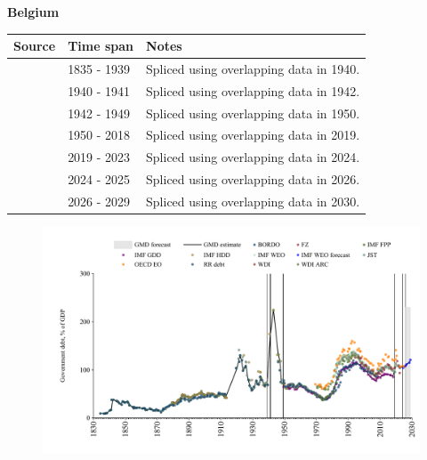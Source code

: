 \documentclass[12pt,a4paper,landscape]{article}
\begin{document}
\begin{adjustbox}{max totalsize={\paperwidth}{\paperheight},center}
\begin{minipage}[t][\textheight][t]{\textwidth}
\vspace*{0.5cm}
{}
\begin{center}
{\Large\bfseries Belgium}
\end{center}
\vspace{0.5cm}
\begin{table}[H]
\centering
\small
\begin{tabular}{|l|l|l|}
\hline
\textbf{Source} & \textbf{Time span} & \textbf{Notes} \\
\hline
\rowcolor{white}\cite{IMF_FPP}& 1835 - 1939 &Spliced using overlapping data in 1940.\\
\rowcolor{lightgray}\cite{IMF_HDD}& 1940 - 1941 &Spliced using overlapping data in 1942.\\
\rowcolor{white}\cite{IMF_FPP}& 1942 - 1949 &Spliced using overlapping data in 1950.\\
\rowcolor{lightgray}\cite{IMF_GDD}& 1950 - 2018 &Spliced using overlapping data in 2019.\\
\rowcolor{white}\cite{IMF_FPP}& 2019 - 2023 &Spliced using overlapping data in 2024.\\
\rowcolor{lightgray}\cite{OECD_EO}& 2024 - 2025 &Spliced using overlapping data in 2026.\\
\rowcolor{white}\cite{IMF_WEO_forecast}& 2026 - 2029 &Spliced using overlapping data in 2030.\\
\hline
\end{tabular}
\end{table}
\begin{figure}[H]
\centering
\includegraphics[width=\textwidth,height=0.6\textheight,keepaspectratio]{graphs/BEL_govdebt_GDP.pdf}
\end{figure}
\end{minipage}
\end{adjustbox}
\end{document}
